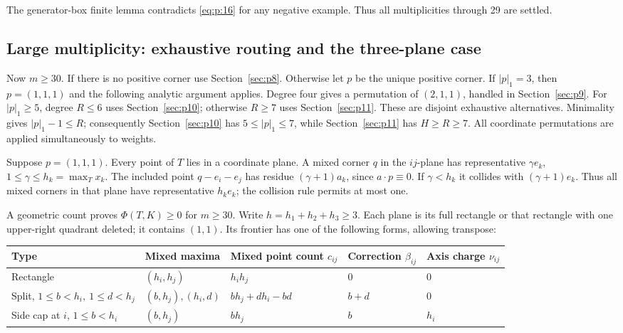 The generator-box finite lemma contradicts \eqref{eq:p:16} for any negative example.
Thus all multiplicities through 29 are settled.

\subsection{Large multiplicity: exhaustive routing and the three-plane case}\label{sec:p7}

Now \(m\ge30\). If there is no positive corner use Section~\ref{sec:p8}.
Otherwise let \(p\) be the unique positive corner.
If \(|p|_1=3\), then \(p=(1,1,1)\) and the following analytic argument applies.
Degree four gives a permutation of \((2,1,1)\), handled in Section~\ref{sec:p9}.
For \(|p|_1\ge5\), degree \(R\le6\) uses Section~\ref{sec:p10}; otherwise \(R\ge7\)
uses Section~\ref{sec:p11}. These are disjoint exhaustive alternatives.
Minimality gives \(|p|_1-1\le R\); consequently Section~\ref{sec:p10} has
\(5\le|p|_1\le7\), while Section~\ref{sec:p11} has \(H\ge R\ge7\).
All coordinate permutations are applied simultaneously to weights.

Suppose \(p=(1,1,1)\). Every point of \(T\) lies in a coordinate plane.
A mixed corner \(q\) in the \(ij\)-plane has representative \(\gamma e_k\),
\(1\le\gamma\le h_k=\max_Tx_k\). The included point
\(q-e_i-e_j\) has residue \((\gamma+1)a_k\), since \(a\cdot p\equiv0\).
If \(\gamma<h_k\) it collides with \((\gamma+1)e_k\).
Thus all mixed corners in that plane have representative \(h_ke_k\);
the collision rule permits at most one.

A geometric count proves \(\Phi(T,K)\ge0\) for \(m\ge30\).
Write \(h=h_1+h_2+h_3\ge3\).
Each plane is its full rectangle or that rectangle with one upper-right
quadrant deleted; it contains \((1,1)\).
Its frontier has one of the following forms, allowing transpose:

\begin{center}
\small
\begin{tabular}{@{}lllll@{}}
\toprule
Type & Mixed maxima & Mixed point count \(c_{ij}\) & Correction \(\beta_{ij}\) & Axis charge \(\nu_{ij}\) \\
\midrule
Rectangle & \((h_i,h_j)\) & \(h_ih_j\) & 0 & 0 \\
Split, \(1\le b<h_i,\ 1\le d<h_j\) & \((b,h_j),(h_i,d)\) & \(bh_j+dh_i-bd\) & \(b+d\) & 0 \\
Side cap at \(i\), \(1\le b<h_i\) & \((b,h_j)\) & \(bh_j\) & \(b\) & \(h_i\) \\
\bottomrule
\end{tabular}
\end{center}

